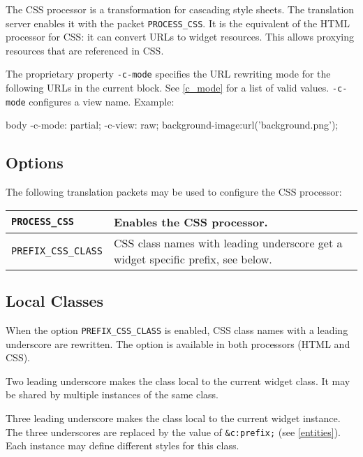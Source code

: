 \documentclass[a4paper,12pt]{article}
\begin{document}
The CSS processor is a transformation for cascading style sheets.  The
translation server enables it with the packet \verb|PROCESS_CSS|.
It is the equivalent of the HTML processor for CSS: it can convert
URLs to widget resources.  This allows proxying resources that are
referenced in CSS.

The proprietary property \texttt{-c-mode} specifies the URL rewriting
mode for the following URLs in the current block.  See \ref{c_mode}
for a list of valid values.  \texttt{-c-mode} configures a view name.
Example:

\begin{verbatim*}
body {
  -c-mode: partial;
  -c-view: raw;
  background-image:url('background.png');
}
\end{verbatim*}

\subsection{Options}

The following translation packets may be used to configure the
CSS processor:

\begin{longtable}{|l|p{8cm}|}
\hline

\verb|PROCESS_CSS| & Enables the CSS processor. \\

\hline

\verb|PREFIX_CSS_CLASS| & CSS class names with leading underscore
get a widget specific prefix, see below. \\

\hline
\end{longtable}


\subsection{Local Classes}
\label{prefix_css_class}

When the option \verb|PREFIX_CSS_CLASS| is enabled, CSS class
names with a leading underscore are rewritten.  The option is
available in both processors (HTML and CSS).

Two leading underscore makes the class local to the current
widget class.  It may be shared by multiple instances of the same
class.

Three leading underscore makes the class local to the current widget
instance.  The three underscores are replaced by the value of
\verb|&c:prefix;| (see \ref{entities}).  Each instance may define
different styles for this class.
\end{document}
